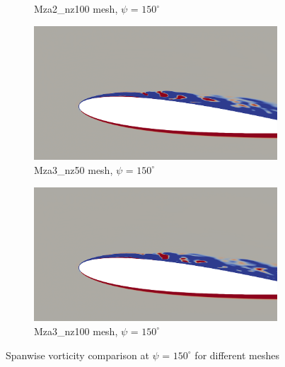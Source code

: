\begin{figure}[H]
\begin{subfigure}[b]{0.475\textwidth}
		\caption{Mza2\_nz100 mesh, $\psi$ = $150^\circ$}
		\label{fig:Mza2_100_sp_psi150}
	\end{subfigure}
	\begin{subfigure}[b]{0.475\textwidth}
		\centering
		\includegraphics[width=1\textwidth]{figures/zonal_adapt_results/vorticity_plots/v2/Mza3_50/spavg/phase_150.png}
		\caption{Mza3\_nz50 mesh, $\psi$ = $150^\circ$}
		\label{fig:Mza3_50_sp_psi150}
	\end{subfigure}
	\begin{subfigure}[b]{0.475\textwidth}
		\centering
		\includegraphics[width=1\textwidth]{figures/zonal_adapt_results/vorticity_plots/v2/Mza3_100/spavg/phase_150.png}
		\caption{Mza3\_nz100 mesh, $\psi$ = $150^\circ$}
		\label{fig:Mza3_100_sp_psi150}
	\end{subfigure}
	\caption{Spanwise vorticity comparison at $\psi$ = $150^\circ$ for different meshes}
	\label{fig:vorticity_zonal_150}
\end{figure}






